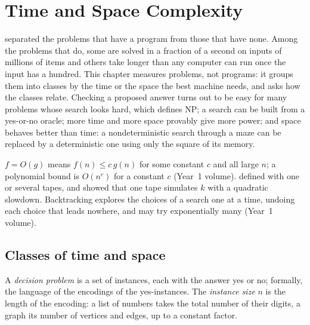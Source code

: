 \chapter{Time and Space Complexity}\label{ch:b3:complexity-classes}

 separated the problems that have a program from those that have none. Among the problems that do, some are solved in a fraction of a second on inputs of millions of items and others take longer than any computer can run once the input has a hundred. This chapter measures problems, not programs: it groups them into classes by the time or the space the best machine needs, and asks how the classes relate. Checking a proposed answer turns out to be easy for many problems whose search looks hard, which defines NP; a search can be built from a yes-or-no oracle; more time and more space provably give more power; and space behaves better than time: a nondeterministic search through a maze can be replaced by a deterministic one using only the square of its memory.

\begin{recall}
$f = O(g)$ means $f(n) \le c\,g(n)$ for some constant $c$ and all large $n$; a polynomial bound is $O(n^c)$ for a constant $c$ (Year~1 volume).  defined  with one or several tapes, and showed that one tape simulates $k$ with a quadratic slowdown. Backtracking explores the choices of a search one at a time, undoing each choice that leads nowhere, and may try exponentially many (Year~1 volume).
\end{recall}

\section{Classes of time and space}\label{sec:b3:complexity-classes:classes}

\begin{definition}\label{def:b3:complexity-classes:decision}
A \emph{decision problem} is a set of instances, each with the answer yes or no; formally, the language of the encodings of the yes-instances. The \emph{instance size} $n$ is the length of the encoding: a list of numbers takes the total number of their digits, a graph its number of vertices and edges, up to a constant factor.
\end{definition}

